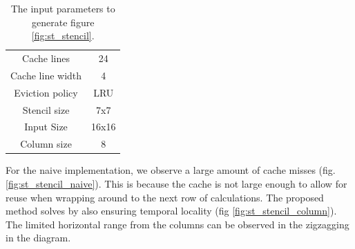 \documentclass{article}
\begin{document}
\begin{table}[H]
    \centering
    \begin{tabular}{|c c|}
        \hline
        Cache lines      & 24   \\
        Cache line width & 4    \\
        Eviction policy  & LRU  \\
        \hline
        Stencil size     & 7x7  \\
        Input Size       & 16x16\\
        Column size      & 8    \\
        \hline
    \end{tabular}
    \caption{
        The input parameters to generate figure \ref{fig:st_stencil}.
    }
    \label{tab:sim_stencil_params}
\end{table}

For the naive implementation, we observe a large amount of cache misses (fig. \ref{fig:st_stencil_naive}).
This is because the cache is not large enough to allow for reuse when wrapping around to the next row of calculations.
The proposed method solves by also ensuring temporal locality (fig \ref{fig:st_stencil_column}).
The limited horizontal range from the columns can be observed in the zigzagging in the diagram.
\end{document}
